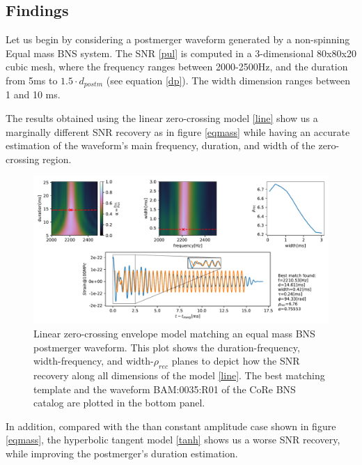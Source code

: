 \subsection*{Findings}

Let us begin by considering a postmerger waveform generated by a non-spinning Equal mass BNS system. The SNR \ref{pul} is computed in a 3-dimensional 80x80x20 cubic mesh, where the frequency ranges between 2000-2500Hz, and the duration from 5ms to $1.5\cdot d_{postm}$ (see equation \ref{dp}). The width dimension ranges between 1 and 10 ms.

The results obtained using the linear zero-crossing model \ref{line} show us a marginally different SNR recovery as in figure \ref{eqmass} while having an accurate estimation of the waveform's main frequency, duration, and width of the zero-crossing region.

\begin{figure}[hbt!]
\begin{center}
\includegraphics[width=\textwidth, angle=0]{images/Data_analysis/results/envel_35_lin.pdf}
\captionsetup{width=0.8\textwidth}
\caption[Linear zero-crossing envelope model matching an equal mass BNS postmerger waveform]{Linear zero-crossing envelope model matching an equal mass BNS postmerger waveform. This plot shows the duration-frequency, width-frequency, and width-$\rho_{rec}$ planes to depict how the SNR recovery along all dimensions of the model \ref{line}. The best matching template and the waveform BAM:0035:R01 of the CoRe BNS catalog \cite{Dietrich:2018phi} are plotted in the bottom panel.}
\end{center} 
\end{figure}

\FloatBarrier

In addition, compared with the than constant amplitude case shown in figure \ref{eqmass}, the hyperbolic tangent model \ref{tanh} shows us a worse SNR recovery, while improving the postmerger's duration estimation.

